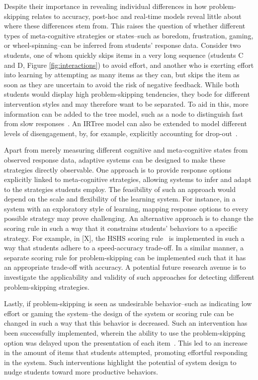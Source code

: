 \documentclass[11pt]{article}
\begin{document}
Despite their importance in revealing individual differences in how problem-skipping relates to accuracy, post-hoc and real-time models reveal little about where these differences stem from. This raises the question of whether different types of meta-cognitive strategies or states--such as boredom, frustration, gaming, or wheel-spinning--can be inferred from students' response data. Consider two students, one of whom quickly skips items in a very long sequence (students C and D, Figure \ref{fig:interactions}) to avoid effort, and another who is exerting effort into learning by attempting as many items as they can, but skips the item as soon as they are uncertain to avoid the risk of negative feedback. While both students would display high problem-skipping tendencies, they bode for different intervention styles and may therefore want to be separated. To aid in this, more information can be added to the tree model, such as a node to distinguish fast from slow responses~\parencite{coomans2016distinguishing, hofman2018fast}. An IRTree model can also be extended to model different levels of disengagement, by, for example, explicitly accounting for drop-out~\parencite{huang2020mixture}. 

Apart from merely measuring different cognitive and meta-cognitive states from observed response data, adaptive systems can be designed to make these strategies directly observable. One approach is to provide response options explicitly linked to meta-cognitive strategies, allowing systems to infer and adapt to the strategies students employ. The feasibility of such an approach would depend on the scale and flexibility of the learning system. For instance, in a system with an exploratory style of learning, mapping response options to every possible strategy may prove challenging. An alternative approach is to change the scoring rule in such a way that it constrains students' behaviors to a specific strategy. For example, in [X], the HSHS scoring rule~\parencite{maris2012speed} is implemented in such a way that students adhere to a speed-accuracy trade-off. In a similar manner, a separate scoring rule for problem-skipping can be implemented such that it has an appropriate trade-off with accuracy. A potential future research avenue is to investigate the applicability and validity of such approaches for detecting different problem-skipping strategies. 

Lastly, if problem-skipping is seen as undesirable behavior--such as indicating low effort or gaming the system--the design of the system or scoring rule can be changed in such a way that this behavior is decreased. Such an intervention has been successfully implemented, wherein the ability to use the problem-skipping option was delayed upon the presentation of each item~\parencite{savi2018delaying}. This led to an increase in the amount of items that students attempted, promoting effortful responding in the system. Such interventions highlight the potential of system design to nudge students toward more productive behaviors.
\end{document}
